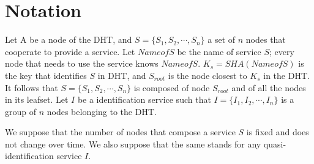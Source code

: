 \section{Notation}

Let A be a node of the DHT, and $S = \{S_1, S_2, \cdots, S_n\}$ a set of $n$
nodes that cooperate to provide a service. Let $NameofS$ be the name of service
$S$; every node that needs to use the service knows $NameofS$. $K_s =
SHA(NameofS)$ is the key that identifies $S$ in DHT, and $S_{root}$ is the node
closest to $K_s$ in the DHT. It follows that $S = \{S_1, S_2, \cdots, S_n\}$ is
composed of node $S_{root}$ and of all the nodes in its leafset. Let $I$ be a
identification service such that $I = \{ I_1, I_2, \cdots, I_n\}$ is a group of
$n$ nodes belonging to the DHT. 


We suppose that the number of nodes that compose a service $S$ is fixed and does
not change over time. We also suppose that the same stands for any
quasi-identification service $I$.

